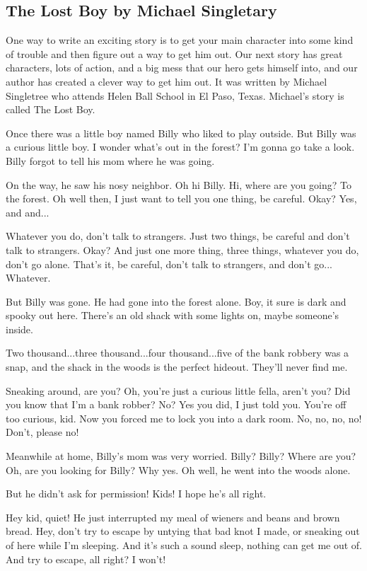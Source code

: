 \subsection{The Lost Boy by Michael Singletary}

One way to write an exciting story is to get your main character into some kind of trouble and then figure out a way to get him out.
Our next story has great characters, lots of action, and a big mess that our hero gets himself into, and our author has created a clever way to get him out.
It was written by Michael Singletree who attends Helen Ball School in El Paso, Texas.
Michael's story is called The Lost Boy.

Once there was a little boy named Billy who liked to play outside.
But Billy was a curious little boy.
I wonder what's out in the forest?
I'm gonna go take a look.
Billy forgot to tell his mom where he was going.

On the way, he saw his nosy neighbor.
Oh hi Billy.
Hi, where are you going?
To the forest.
Oh well then, I just want to tell you one thing, be careful.
Okay?
Yes, and and...

Whatever you do, don't talk to strangers.
Just two things, be careful and don't talk to strangers.
Okay?
And just one more thing, three things, whatever you do, don't go alone.
That's it, be careful, don't talk to strangers, and don't go...
Whatever.

But Billy was gone.
He had gone into the forest alone.
Boy, it sure is dark and spooky out here.
There's an old shack with some lights on, maybe someone's inside.

Two thousand...three thousand...four thousand...five of the bank robbery was a snap, and the shack in the woods is the perfect hideout.
They'll never find me.

Sneaking around, are you?
Oh, you're just a curious little fella, aren't you?
Did you know that I'm a bank robber?
No?
Yes you did, I just told you.
You're off too curious, kid.
Now you forced me to lock you into a dark room.
No, no, no, no!
Don't, please no!

Meanwhile at home, Billy's mom was very worried.
Billy?
Billy?
Where are you?
Oh, are you looking for Billy?
Why yes.
Oh well, he went into the woods alone.

But he didn't ask for permission!
Kids!
I hope he's all right.

Hey kid, quiet!
He just interrupted my meal of wieners and beans and brown bread.
Hey, don't try to escape by untying that bad knot I made, or sneaking out of here while I'm sleeping.
And it's such a sound sleep, nothing can get me out of.
And try to escape, all right?
I won't!

